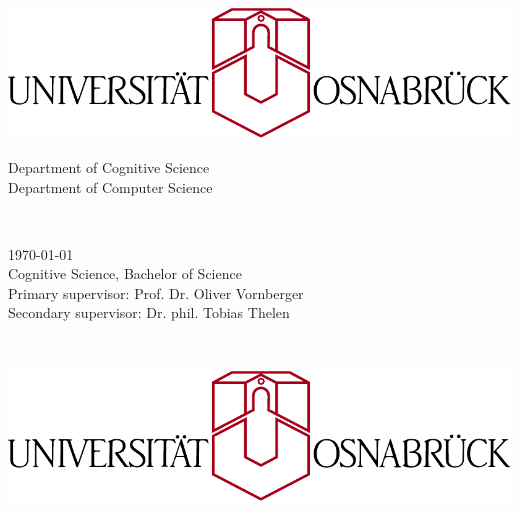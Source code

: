 \begin{titlepage}
  \begin{addmargin}[-1cm]{-3cm}
    \begin{center}
      \large
      \hfill

       \\ \bigskip

      \includegraphics[width=\textwidth]{img/uos2} \\
      \bigskip

      Department of Cognitive Science\\ \medskip
      Department of Computer Science

      \vfill

      \Large
       \\
      \bigskip

      \begingroup
        \LARGE
        \color{uos_red}
      \endgroup
      \bigskip

      \Large

      \vfill
      \vfill
    \end{center}

    \today \\
    Cognitive Science, Bachelor of Science \\
    Primary supervisor: Prof. Dr. Oliver Vornberger \\
    Secondary supervisor: Dr. phil. Tobias Thelen \\
  \end{addmargin}
  \cleardoublepage

  \thispagestyle{empty}
  \begin{addmargin}[-1cm]{-3cm}
    \begin{center}
      \large
      \hfill

      \spacedlowsmallcaps{ } \\ \bigskip

      \includegraphics[width=\textwidth]{img/uos2} \\
      \bigskip


\end{center}
\end{addmargin}
\end{titlepage}
